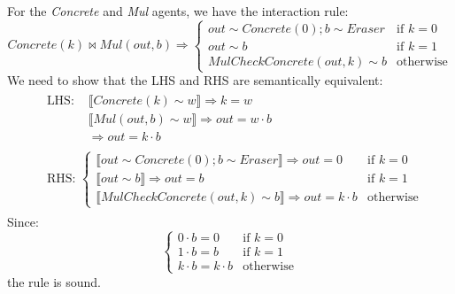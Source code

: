 \begin{lemma}
	For the \textit{Concrete} and \textit{Mul} agents, we have the interaction rule:
	$$
	\mathit{Concrete}(k) \bowtie \mathit{Mul}(\mathit{out}, b) \Rightarrow
	\begin{cases}
		\mathit{out} \sim \mathit{Concrete}(0); b \sim \mathit{Eraser} & \text{if } k = 0 \\
		\mathit{out} \sim  b & \text{if } k = 1 \\
		\mathit{MulCheckConcrete}(\mathit{out}, k) \sim b & \text{otherwise}
	\end{cases}
	$$
	We need to show that the LHS and RHS are semantically equivalent:
	$$
	\begin{aligned}
		& \begin{aligned}
			\text{LHS: } & \llbracket \mathit{Concrete}(k) \sim w \rrbracket \Rightarrow k = w \\
			& \llbracket \mathit{Mul}(\mathit{out}, b) \sim w \rrbracket \Rightarrow \mathit{out} = w \cdot b \\
			& \Rightarrow \mathit{out} = k \cdot b
		\end{aligned} \\
		& \begin{aligned}
			\text{RHS: }
			\begin{cases}
				\llbracket \mathit{out} \sim \mathit{Concrete}(0); b \sim \mathit{Eraser} \rrbracket \Rightarrow \mathit{out} = 0 & \text{if } k = 0 \\
				\llbracket \mathit{out} \sim b \rrbracket \Rightarrow \mathit{out} = b & \text{if } k = 1 \\
				\llbracket \mathit{MulCheckConcrete}(\mathit{out}, k) \sim b \rrbracket \Rightarrow \mathit{out} = k \cdot b & \text{otherwise}
			\end{cases}
		\end{aligned}
	\end{aligned}
	$$
	Since:
	$$
	\begin{cases}
		0 \cdot b = 0 & \text{if } k = 0 \\
		1 \cdot b = b & \text{if } k = 1 \\
		k \cdot b = k \cdot b & \text{otherwise}
	\end{cases}
	$$
	the rule is sound.
\end{lemma}

